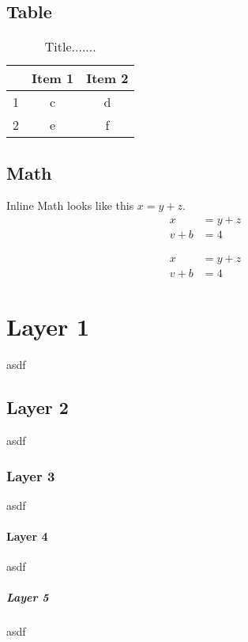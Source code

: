 \subsection{Table}
\begin{table}[H] %
	\begin{center}
		\begin{tabular}{c|cc}
			& Item 1 & Item 2 \\
			\hline
			1 & c & d \\
			2 & e & f
		\end{tabular}
		\caption{Title.......}
		\label{tab:8bitnumber}
	\end{center}
\end{table}

\subsection{Math}
Inline Math looks like this $x = y + z$.
\begin{align}
	x &= y + z \\
	v + b &= 4
\end{align}

\begin{align*}
x &= y + z \\
v + b &= 4
\end{align*}

\section{Layer 1}
asdf
\subsection{Layer 2}
asdf
\subsubsection{Layer 3}
asdf
\paragraph{Layer 4}
asdf
\subparagraph{Layer 5}
asdf